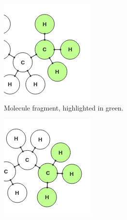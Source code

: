 \begin{figure}[h!]
\centering
\begin{subfigure}[t]{0.29\textwidth}
\centering
\includegraphics[width=\textwidth]{img/match_1.png}
\caption{Molecule fragment, highlighted in green.}
\end{subfigure}%
\qquad
\begin{subfigure}[t]{0.29\textwidth}
\centering
\includegraphics[width=\textwidth]{img/match_2.png}

\end{subfigure}
\end{figure}
